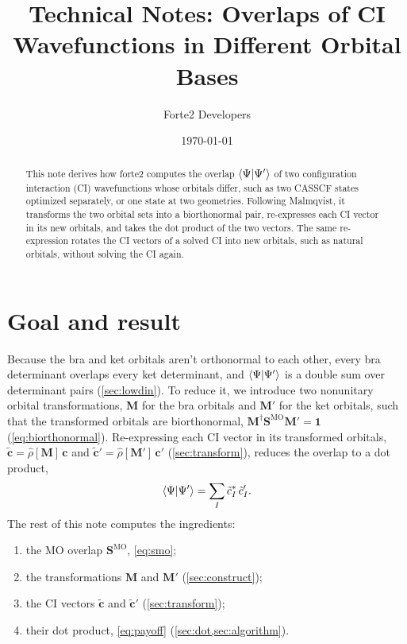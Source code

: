 \documentclass[aip,jcp,preprint]{revtex4-1}
\newcommand{\bvec}[1]{\mathbf{#1}}
\newcommand{\SMO}{\bvec{S}^{\mathrm{MO}}}
\begin{document}
\title{Technical Notes: Overlaps of CI Wavefunctions in Different Orbital Bases}
\author{Forte2 Developers}
\noaffiliation
\date{\today}

\begin{abstract}
This note derives how forte2 computes the overlap $\braket{\Psi|\Psi'}$ of two configuration interaction (CI) wavefunctions whose orbitals differ, such as two CASSCF states optimized separately, or one state at two geometries.
Following Malmqvist, it transforms the two orbital sets into a biorthonormal pair, re-expresses each CI vector in its new orbitals, and takes the dot product of the two vectors.
The same re-expression rotates the CI vectors of a solved CI into new orbitals, such as natural orbitals, without solving the CI again.
\end{abstract}

\maketitle

\section{Goal and result}
\label{sec:goal}

Because the bra and ket orbitals aren't orthonormal to each other, every bra determinant overlaps every ket determinant, and $\braket{\Psi|\Psi'}$ is a double sum over determinant pairs (\cref{sec:lowdin}).
To reduce it, we introduce two nonunitary orbital transformations, $\bvec{M}$ for the bra orbitals and $\bvec{M}'$ for the ket orbitals, such that the transformed orbitals are biorthonormal, $\bvec{M}^\dagger\SMO\bvec{M}' = \bvec{1}$ (\cref{eq:biorthonormal}).
Re-expressing each CI vector in its transformed orbitals, $\tilde{\bvec{c}} = \hat{\rho}[\bvec{M}]\,\bvec{c}$ and $\tilde{\bvec{c}}' = \hat{\rho}[\bvec{M}']\,\bvec{c}'$ (\cref{sec:transform}), reduces the overlap to a dot product,
\begin{equation}
 \braket{\Psi|\Psi'} = \sum_I \tilde{c}_I^{*}\, \tilde{c}'_I.
 \label{eq:payoff}
\end{equation}
The rest of this note computes the ingredients:
\begin{enumerate}
\item the MO overlap $\SMO$, \cref{eq:smo};
\item the transformations $\bvec{M}$ and $\bvec{M}'$ (\cref{sec:construct});
\item the CI vectors $\tilde{\bvec{c}}$ and $\tilde{\bvec{c}}'$ (\cref{sec:transform});
\item their dot product, \cref{eq:payoff} (\cref{sec:dot,sec:algorithm}).
\end{enumerate}
\end{document}
